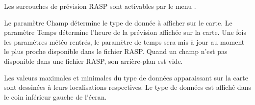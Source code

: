 Les surcouches de prévision RASP sont activables par le menu
.

Le paramètre Champ détermine le type de donnée à afficher sur le carte.
Le paramètre Temps détermine l'heure de la prévision affichée sur la carte. 
Une fois les paramètres météo rentrés, le paramètre de temps sera mis à jour au moment le plus proche disponible dans le fichier RASP.\@
Quand un champ n'est pas disponible dans une fichier RASP, son arrière-plan est vide.

Les valeurs maximales et minimales du type de données apparaissant sur la carte sont dessinées 
à leurs localisations respectives.
Le type de données est affiché dans le coin inférieur gauche de l'écran.

